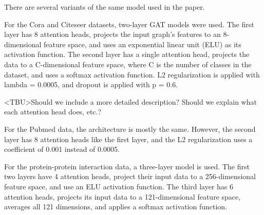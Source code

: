 There are several variants of the same model used in the paper.

For the Cora and Citeseer datasets, two-layer GAT models were used.  The first
layer has 8 attention heads, projects the input graph's features to an
8-dimensional feature space, and uses an exponential linear unit (ELU) as its
activation function.  The second layer has a single attention head, projects
the data to a C-dimensional feature space, where C is the number of classes in
the dataset, and uses a softmax activation function.  L2 regularization is
applied with lambda = 0.0005, and dropout is applied with p = 0.6.

<TBU>Should we include a more detailed description? Should we explain what each
attention head does, etc.?

For the Pubmed data, the architecture is mostly the same. However, the second
layer has 8 attention heads like the first layer, and the L2 regularization
uses a coefficient of 0.001 instead of 0.0005.

For the protein-protein interaction data, a three-layer model is used. The
first two layers have 4 attention heads, project their input data to a
256-dimensional feature space, and use an ELU activation function. The third
layer has 6 attention heads, projects its input data to a 121-dimensional
feature space, averages all 121 dimensions, and applies a softmax activation
function.
